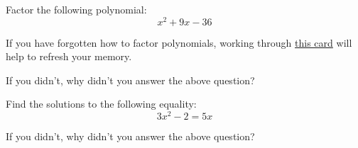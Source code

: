 \documentclass{ximera}
\begin{document}
\begin{problem}
\begin{problem} 
    Factor the following polynomial:
    $$x^2 + 9x -36$$
    
    \begin{hint}
    If you have forgotten how to factor polynomials, working through \href{https://ximera.osu.edu/math160fa17/m160prerequisites/prerequisiteVideos/fundamentalsOfFactoring}{this card} will help to refresh your memory. 
    \end{hint}
    
  \begin{multipleChoice}
      
      
  \end{multipleChoice}
  
\end{problem}
\begin{question}

    If you didn't, why didn't you answer the above question?
    
    \begin{multipleChoice}

      
  \end{multipleChoice}
\end{question}
\end{problem}

\begin{problem} 
\begin{problem}

    Find the solutions to the following equality:
    $$3x^2 -2 = 5x$$
    
    
  \begin{multipleChoice}
      

     
    \end{multipleChoice}
    
\end{problem}
\begin{question}

    If you didn't, why didn't you answer the above question?

    \begin{multipleChoice}

  \end{multipleChoice}
\end{question}
\end{problem}
\end{document}
